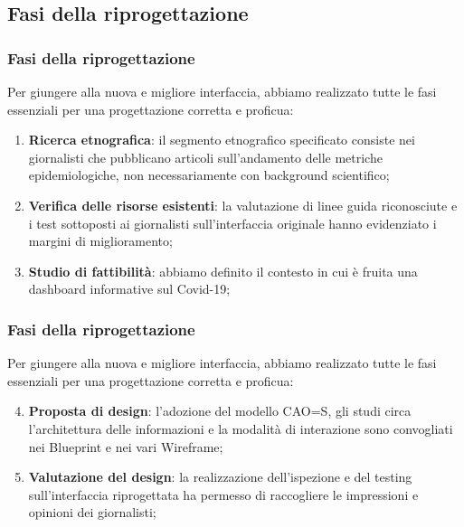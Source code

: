
\subsection{Fasi della riprogettazione}

\begin{frame}
    \frametitle{Fasi della riprogettazione}
    Per giungere alla nuova e migliore interfaccia, abbiamo realizzato tutte le fasi essenziali per una progettazione corretta e proficua:
    \begin{enumerate}
        \item<1-> \textbf{Ricerca etnografica}: il segmento etnografico specificato consiste nei giornalisti che pubblicano articoli sull'andamento delle metriche epidemiologiche, non necessariamente con background scientifico;
        \item<2-> \textbf{Verifica delle risorse esistenti}: la valutazione di linee guida riconosciute e i test sottoposti ai giornalisti sull'interfaccia originale hanno evidenziato i margini di miglioramento;
        \item<3->  \textbf{Studio di fattibilità}: abbiamo definito il contesto in cui è fruita una dashboard informative sul Covid-19;
    \end{enumerate}  

\end{frame}

\begin{frame}
    \frametitle{Fasi della riprogettazione}
    Per giungere alla nuova e migliore interfaccia, abbiamo realizzato tutte le fasi essenziali per una progettazione corretta e proficua: 
    \begin{enumerate}
        \setcounter{enumi}{3}
        \item<1-> \textbf{Proposta di design}: l'adozione del modello CAO=S, gli studi circa l'architettura delle informazioni e la modalità di interazione sono convogliati nei Blueprint e nei vari Wireframe;
        \item<2-> \textbf{Valutazione del design}: la realizzazione dell'ispezione e del testing sull'interfaccia riprogettata ha permesso di raccogliere le impressioni e opinioni dei giornalisti;
    \end{enumerate}  

\end{frame}


